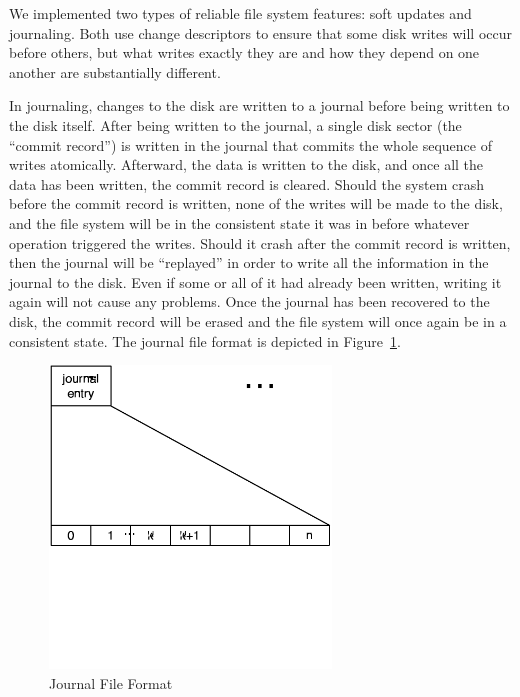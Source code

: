 We implemented two types of reliable file system features: soft updates and
journaling. Both use change descriptors to ensure that some disk writes will
occur before others, but what writes exactly they are and how they depend on one
another are substantially different.

In journaling, changes to the disk are written to a journal before being
written to the disk itself. After being written to the journal, a single disk
sector (the ``commit record'') is written in the journal that commits the whole
sequence of writes atomically. Afterward, the data is written to the disk, and
once all the data has been written, the commit record is cleared. Should the
system crash before the commit record is written, none of the writes will be
made to the disk, and the file system will be in the consistent state it was in
before whatever operation triggered the writes. Should it crash after the commit
record is written, then the journal will be ``replayed'' in order to write all
the information in the journal to the disk. Even if some or all of it had
already been written, writing it again will not cause any problems. Once the
journal has been recovered to the disk, the commit record will be erased and the
file system will once again be in a consistent state. The journal file format is
depicted in Figure~\ref{fig:journal}.

\begin{figure}[htb]
\begin{center}
  \includegraphics[width=7.5cm]{journal_diagram}
  \caption{Journal File Format}
  \label{fig:journal}
\end{center}
\end{figure}

